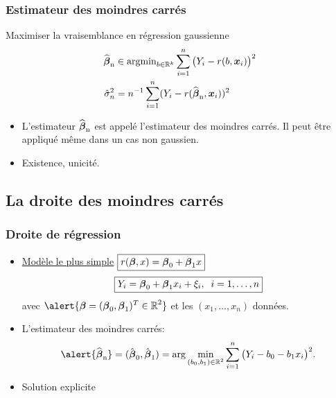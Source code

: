 \begin{frame}
\frametitle{Estimateur des moindres carrés}
Maximiser la
\alert{ vraisemblance} en régression gaussienne
\begin{align*}
\operatorname{\widehat{\boldsymbol{\beta}}_n} &\in \mathrm{argmin}_{b \in \mathbb{R}^k} \sum_{i = 1}^n \big(Y_i-r(b,\operatorname{\boldsymbol{x}}_i)\big)^2 \\
\hat{\sigma}_n^2 &= n^{-1} \sum_{i=1}^n (Y_i - r(\operatorname{\widehat{\boldsymbol{\beta}}_n},\operatorname{\boldsymbol{x}}_i))^2
\end{align*}
\begin{itemize}
\item  L'estimateur $\operatorname{\widehat{\boldsymbol{\beta}}_n}$ est appelé l'\alert{estimateur des moindres carrés}. Il peut être appliqué même dans un cas non gaussien.
\item \alert{ Existence, unicité.}
\end{itemize}
\end{frame}

\subsection{La droite des moindres carrés}

\begin{frame}
\frametitle{Droite de régression}
\begin{itemize}
\item \underline{Modèle le plus simple}
$\boxed{r(\boldsymbol{\beta},x)= \boldsymbol{\beta}_0 + \boldsymbol{\beta}_1 x}$
$$\boxed{Y_i = \boldsymbol{\beta}_0 + \boldsymbol{\beta}_1 x_i+\xi_i,\;\;i=1,\ldots,n}$$
avec $\alert{\truebeta = (\truebeta_0,\truebeta_1)^T \in \R^2}$ et les
$(x_1,\ldots, x_n)$ données.
\item L'estimateur des moindres carrés:
$$\alert{\estregress}=(\hat{\truebeta}_0, \hat{\truebeta}_1) =
\arg \min_{(\curbeta_0,\curbeta_1)\in \R^2}\sum_{i = 1}^n \big(Y_i- \curbeta_0 - \curbeta_1 x_i\big)^2.
$$
\item \alert{Solution explicite}
\end{itemize}
\end{frame}

